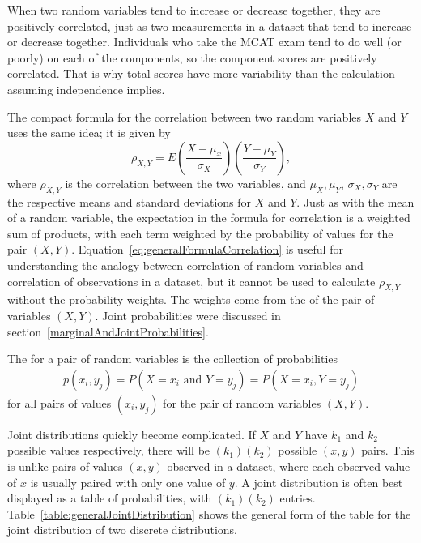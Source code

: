 When two random variables tend to increase or decrease together, they are positively correlated, just as two measurements in a dataset that tend to increase or decrease together. Individuals who take the MCAT exam tend to do well (or poorly) on each of the components, so the component scores are positively correlated.  That is why total scores have more variability than the calculation assuming independence implies.

The compact formula for the correlation between two random variables $X$ and $Y$  uses the same idea; it is given by
\begin{equation*}
	\rho_{X,Y} = E\left(\frac{X - \mu_x}{\sigma_X}\right)\left(\frac{Y - \mu_Y}{\sigma_Y} \right),
	\label{eq:generalFormulaCorrelation}
\end{equation*}
where $\rho_{X,Y}$ is the correlation between the two variables, and $\mu_X, \mu_Y$, $\sigma_X, \sigma_Y$ are the respective means and standard deviations for $X$ and $Y$. Just as with the mean of a random variable, the expectation in the formula for correlation is a weighted sum of products, with each term weighted by the probability of values for the pair $(X,Y)$.  Equation~\ref{eq:generalFormulaCorrelation} is useful for understanding the analogy between correlation of random variables and correlation of observations in a dataset, but it cannot be used to calculate $\rho_{X,Y}$ without the probability weights.  The weights come from the  of the pair of variables $(X,Y)$.  Joint probabilities were discussed in section~\ref{marginalAndJointProbabilities}.

\begin{termBox}{
The  for a pair of random variables is the collection of probabilities
\begin{align*}
	  p(x_i,y_j) = P(X=x_i \text{ and } Y = y_j) = P(X=x_i, Y=y_j)
\end{align*}
for all pairs of values $(x_i,y_j)$ for the pair of random variables $(X,Y)$.}
\end{termBox}

Joint distributions quickly become complicated.  If $X$ and $Y$ have $k_1$ and $k_2$ possible values respectively, there will be $(k_1)(k_2)$ possible $(x,y)$ pairs. This is unlike pairs of values $(x,y)$ observed in a dataset, where each observed value of $x$ is usually paired with only one value of $y$. A joint distribution is often best displayed as a table of probabilities, with $(k_1)(k_2)$ entries.  Table~\ref{table:generalJointDistribution} shows the general form of the table for the joint distribution of two discrete distributions.

